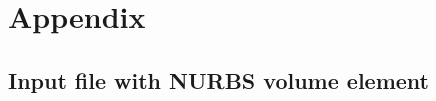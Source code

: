 \chapter{Appendix}
\label{sec:appendix}

\section{Input file with NURBS volume element}
\label{app:NURBSVolumenelement}

